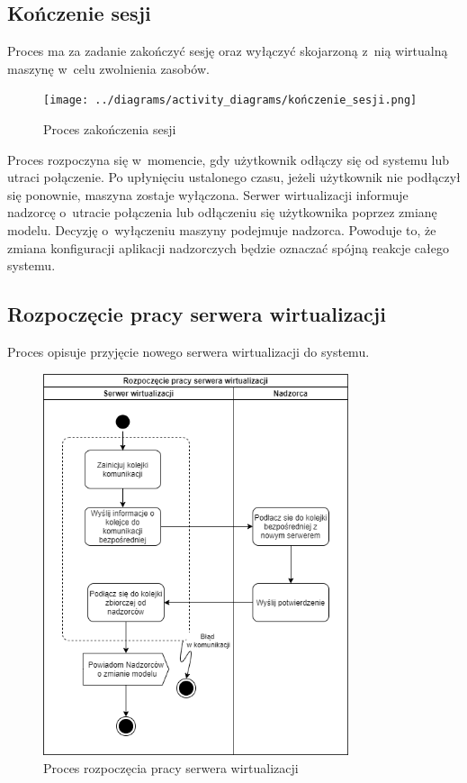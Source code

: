 \documentclass[../opis-rozwiazania.tex]{subfiles}
\begin{document}
\subsection{Kończenie sesji}

Proces ma za zadanie zakończyć sesję oraz wyłączyć skojarzoną z~nią wirtualną maszynę w~celu zwolnienia zasobów.

\begin{figure}[H]
  \centering
  \texttt{[image: ../diagrams/activity\_diagrams/kończenie\_sesji.png]}
  \caption{Proces zakończenia sesji}
  \label{finish_session}
\end{figure}

Proces rozpoczyna się w~momencie, gdy użytkownik odłączy się od systemu lub utraci połączenie. Po upłynięciu ustalonego czasu, jeżeli użytkownik nie podłączył się ponownie, maszyna zostaje wyłączona.
Serwer wirtualizacji informuje nadzorcę o~utracie połączenia lub odłączeniu się użytkownika poprzez zmianę modelu.
Decyzję o~wyłączeniu maszyny podejmuje nadzorca.
Powoduje to, że zmiana konfiguracji aplikacji nadzorczych będzie oznaczać spójną reakcje całego systemu.

\subsection{Rozpoczęcie pracy serwera wirtualizacji}

Proces opisuje przyjęcie nowego serwera wirtualizacji do systemu.

\begin{figure}[H]
  \centering
  \includegraphics[width=0.8\textwidth]{../diagrams/activity_diagrams/serwer_start.png}
  \caption{Proces rozpoczęcia pracy serwera wirtualizacji}
  \label{start_virtsrv}
\end{figure}
\end{document}
